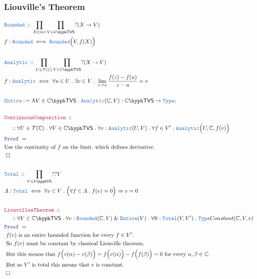 \documentclass[12pt]{scrartcl}
\newcommand{\TYPE}[1]{\textcolor{NavyBlue}{\mathtt{#1}}}
\newcommand{\LOGIC}[1]{\textcolor{Blue}{\mathtt{#1}}}
\newcommand{\THM}[1]{\textcolor{Maroon}{\mathtt{#1}}}
\renewcommand{\.}{\; . \;}
\newcommand{\de}{: \kern 0.1pc =}
\newcommand{\Theorem}[2]{& \THM{#1} \, :: \, #2 \\ & \Proof = \\ }
\newcommand{\DeclareType}[2]{& \TYPE{#1} \, :: \, #2 \\}
\newcommand{\DefineType}[3]{& #1 : \TYPE{#2} \iff #3 \\}
\newcommand{\NewLine}{\\ & \kern 1pc}
\newcommand{\Page}[1]{ \begin{align*} #1 \end{align*}   }
\newcommand{\Explain}[1]{& \text{#1.} \\}
\renewcommand{\And}{\; \& \;}
\newcommand{\Imply}{\Rightarrow}
\newcommand{\Type}{\TYPE{Type}}
\newcommand{\Complex}{\mathbb{C}}
\newcommand{\Set}{\TYPE{Set}}
\newcommand{\Conclude}[3]{& #1 \de #2 : #3; \\}
\newcommand{\QED}{\; \square}
\newcommand{\EndProof}{& \QED \\}
\newcommand{\Proof}{\LOGIC{Proof} \; }
\newcommand{\T}{\mathcal{T}}
\newcommand{\Bounded}{\TYPE{Bounded}}
\newcommand{\VS}[1]{#1\hyph\mathsf{VS}} %
\newcommand{\TVS}[1]{{#1}\hyph\mathsf{TVS}}
\begin{document}
\subsubsection{Liouville's Theorem}
\Page{
	\DeclareType{Bounded}
	{
		\prod_{X \in \Set} 
		\prod_{V \in \TVS{k}} 
		?(X \to V)
	}
	\DefineType{f}{Bounded}{\Bounded\Big(V,f(X)\Big)}
	\\
	\DeclareType{Analytic}
	{
		\prod_{U \in \T(\Complex)} 
		\prod_{V \in \TVS{\Complex}} 
		?(X \to V)
	}
	\DefineType{f}{Analytic}{
		\forall u \in U \. \exists v \in V \. 
		\lim_{z \to u} \frac{f(z) - f(u)}{z - u} = v	
	}
	\\
	\Conclude{\TYPE{Entire}}{\Lambda V \in \TVS{\Complex} \. \TYPE{Analytic}(\Complex,V) }
	{
		\TVS{\Complex} \to \Type
	}
	\\
	\Theorem{ContinuousComposition}
	{
		\NewLine ::		
		\forall U \in \T(\Complex) \.
		\forall V \in \TVS{\Complex} \.
		\forall v : \TYPE{Analytic}(U,V) \.
		\forall f \in V' \.
		\TYPE{Analytic}\Big(U,\Complex, f(v)\Big)
	}
	\Explain{Use the continuity of $f$ on the limit, which defines derivative}
	\EndProof
	\\
	\DeclareType{Total}
	{
		\prod_{V \in \VS{k}} ??V
	}
	\DefineType{A}{Total}{\forall v\in V \. \Big( \forall f \in A \. f(v) = 0\Big) \Imply v = 0}
	\\
	\Theorem{LiouvillesTheorem}
	{
		\NewLine ::		
		\forall V \in \TVS{\Complex} \.
		\forall v : \Bounded(\Complex,V) \And \TYPE{Entire}(V) \.
		\forall \aleph : \TYPE{Total}(V,V') \.
		\Type{Constant}(\Complex,V,v)
	}
	\Explain{ $f(v)$ is an entire bounded function for every $f \in V'$}
	\Explain{ So $f(v)$ must be constant by classical Liouville theorem}
	\Explain{ But this means that 
		$f\Big( v(\alpha) - v(\beta)\Big) = f\Big(v(\alpha)\Big) - f\Big(f(\beta)\Big) = 0$
		for every $\alpha,\beta \in \Complex$}
	\Explain{
		But as $V'$ is total this means that $v$ is constant}
	\EndProof
}
\newpage
\end{document}
